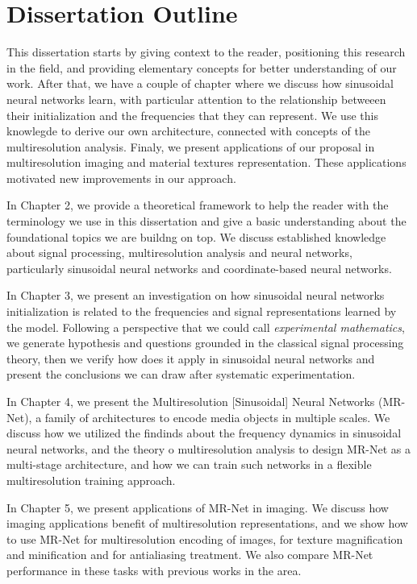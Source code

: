 \section{Dissertation Outline}

This dissertation starts by giving context to the reader, positioning this research in the field, and providing elementary concepts for better understanding of our work. After that, we have a couple of chapter where we discuss how sinusoidal neural networks learn, with particular attention to the relationship betweeen their initialization and the frequencies that they can represent. We use this knowlegde to derive our own architecture, connected with concepts of the multiresolution analysis. Finaly, we present applications of our proposal in multiresolution imaging and material textures representation. These applications motivated new improvements in our approach. 

In Chapter 2, we provide a theoretical framework to help the reader with the terminology we use in this dissertation and give a basic understanding about the foundational topics we are buildng on top. We discuss established knowledge about signal processing, multiresolution analysis and neural networks, particularly sinusoidal neural networks and coordinate-based neural networks.

In Chapter 3, we present an investigation on how sinusoidal neural networks initialization is related to the frequencies and signal representations learned by the model. Following a perspective that we could call \textit{experimental mathematics}, we generate hypothesis and questions grounded in the classical signal processing theory, then we verify how does it apply in sinusoidal neural networks and present the conclusions we can draw after systematic experimentation.

In Chapter 4, we present the Multiresolution [Sinusoidal] Neural Networks (MR-Net), a family of architectures to encode media objects in multiple scales. We discuss how we utilized the findinds about the frequency dynamics in sinusoidal neural networks, and the theory o multiresolution analysis to design MR-Net as a multi-stage architecture, and how we can train such networks in a flexible multiresolution training approach.

In Chapter 5, we present applications of MR-Net in imaging. We discuss how imaging applications benefit of multiresolution representations, and we show how to use MR-Net for multiresolution encoding of images, for texture magnification and minification and for antialiasing treatment. We also compare MR-Net performance in these tasks with previous works in the area.

